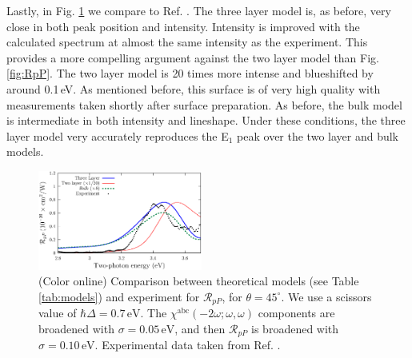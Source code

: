 Lastly, in Fig. \ref{fig:mitchellRpP} we compare to Ref.
\cite{mitchellSS01}. The three layer model is, as before, very close in
both peak position and intensity. Intensity is improved with the calculated
spectrum at almost the same intensity as the experiment. This provides a more
compelling argument against the two layer model than Fig. \ref{fig:RpP}. The two
layer model is 20 times more intense and blueshifted by around 0.1\,eV. As
mentioned before, this surface is of very high quality with measurements taken
shortly after surface preparation. As before, the bulk model is intermediate in
both intensity and lineshape. Under these conditions, the three layer model very
accurately reproduces the E$_{1}$ peak over the two layer and bulk models.

\begin{figure}[t]
\centering
\includegraphics[width=0.48\textwidth]{figures/03-results/shgyield/fig8}
\caption{(Color online) Comparison between theoretical models (see Table
\ref{tab:models}) and experiment for $\mathcal{R}_{pP}$, for
$\theta=45^{\circ}$. We use a scissors value of $\hbar\Delta = 0.7\,\text{eV}$.
The $\chi^{\mathrm{abc}}(-2\omega;\omega,\omega)$ components are broadened with
$\sigma=0.05\,\text{eV}$, and then $\mathcal{R}_{pP}$ is broadened with
$\sigma=0.10\,\text{eV}$. Experimental data taken from Ref.
\cite{mitchellSS01}.\label{fig:mitchellRpP}}
\end{figure}

